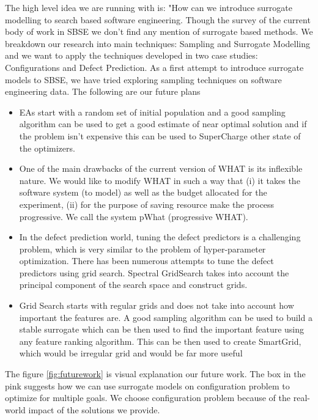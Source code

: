 \documentclass{newsig}
\begin{document}
The high level idea we are running with is: "How can we introduce surrogate modelling to search based software engineering. Though the survey of the current body of work in SBSE we don't find any mention of surrogate based methods. We breakdown our research into main techniques: Sampling and Surrogate Modelling and we want to apply the techniques developed in two case studies: Configurations and Defect Prediction. As a first attempt to introduce surrogate models to SBSE, we have tried exploring sampling techniques on software engineering data. The following are our future plans
\begin{itemize}
\item
EAs start with a random set of initial population and a good sampling algorithm can be used to get a good estimate of near optimal solution and if the problem isn't expensive this can be used to \textquotesingle SuperCharge \textquotesingle other state of the optimizers. 
\item     
One of the main drawbacks of the current version of WHAT is its inflexible nature. We would like to modify WHAT in such a way that (i) it takes the software system (to model) as well as the budget allocated for the experiment, (ii) for the purpose of saving resource make the process progressive. We call the system pWhat (progressive WHAT).
\item
In the defect prediction world, tuning the defect predictors is a challenging problem, which is very similar to the problem of hyper-parameter optimization. There has been numerous attempts to tune the defect predictors using grid search. Spectral GridSearch takes into account the principal component of the search space and construct grids.
\item
Grid Search starts with regular grids and does not take into account how important the features are. A good sampling algorithm can be used to build a stable surrogate which can be then used to find the important feature using any feature ranking algorithm. This can be then used to create SmartGrid, which would be irregular grid and would be far more useful
\end{itemize}




The figure \ref{fig:futurework} is visual explanation our future work. The box in the pink suggests how we can use surrogate models on configuration problem to optimize for multiple goals. We choose configuration problem because of the real-world impact of the solutions we provide.




\balance
  
\end{document}
